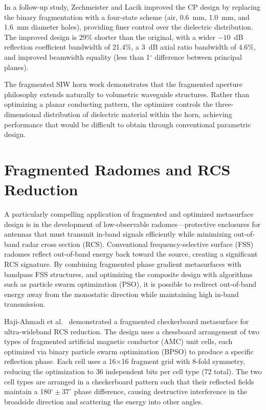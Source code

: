 In a follow-up study, Zechmeister and Lacik \cite{Zechmeister2022Pixelated} improved the CP design by replacing the binary fragmentation with a four-state scheme (air, 0.6~mm, 1.0~mm, and 1.6~mm diameter holes), providing finer control over the dielectric distribution.  The improved design is 29\% shorter than the original, with a wider $-10$~dB reflection coefficient bandwidth of 21.4\%, a 3~dB axial ratio bandwidth of 4.6\%, and improved beamwidth equality (less than 1$^\circ$ difference between principal planes).

The fragmented SIW horn work demonstrates that the fragmented aperture philosophy extends naturally to volumetric waveguide structures.  Rather than optimizing a planar conducting pattern, the optimizer controls the three-dimensional distribution of dielectric material within the horn, achieving performance that would be difficult to obtain through conventional parametric design.


\section{Fragmented Radomes and RCS Reduction}
\label{sec:radomes}


A particularly compelling application of fragmented and optimized metasurface design is in the development of low-observable radomes---protective enclosures for antennas that must transmit in-band signals efficiently while minimizing out-of-band radar cross section (RCS).  Conventional frequency-selective surface (FSS) radomes reflect out-of-band energy back toward the source, creating a significant RCS signature.  By combining fragmented phase gradient metasurfaces with bandpass FSS structures, and optimizing the composite design with algorithms such as particle swarm optimization (PSO), it is possible to redirect out-of-band energy away from the monostatic direction while maintaining high in-band transmission.

Haji-Ahmadi et al.\ \cite{HajiAhmadi2017Checkerboard} demonstrated a fragmented checkerboard metasurface for ultra-wideband RCS reduction.  The design uses a chessboard arrangement of two types of fragmented artificial magnetic conductor (AMC) unit cells, each optimized via binary particle swarm optimization (BPSO) to produce a specific reflection phase.  Each cell uses a 16$\times$16 fragment grid with 8-fold symmetry, reducing the optimization to 36 independent bits per cell type (72 total).  The two cell types are arranged in a checkerboard pattern such that their reflected fields maintain a 180$^\circ \pm 37^\circ$ phase difference, causing destructive interference in the broadside direction and scattering the energy into other angles.

